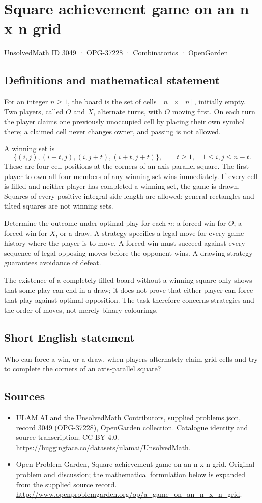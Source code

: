 \documentclass[11pt,a4paper]{article}
\begin{document}
\section*{Square achievement game on an n x n grid}\label{3049}
{\small UnsolvedMath ID 3049 · OPG-37228 · Combinatorics · OpenGarden}
\subsection{Definitions and mathematical statement}
For an integer $n\ge1$, the board is the set of cells
$[n]\times[n]$, initially empty. Two players, called $O$ and $X$, alternate
turns, with $O$ moving first. On each turn the player claims one previously
unoccupied cell by placing their own symbol there; a claimed cell never
changes owner, and passing is not allowed.

A winning set is
\[
 \{(i,j),(i+t,j),(i,j+t),(i+t,j+t)\},
 \qquad t\ge1,\quad 1\le i,j\le n-t.
\]
These are four cell positions at the corners of an axis-parallel square.
The first player to own all four members of any winning set wins immediately.
If every cell is filled and neither player has completed a winning set,
the game is drawn. Squares of every positive integral side length are
allowed; general rectangles and tilted squares are not winning sets.

Determine the outcome under optimal play for each $n$: a forced win for
$O$, a forced win for $X$, or a draw. A strategy specifies a legal move
for every game history where the player is to move. A forced win must
succeed against every sequence of legal opposing moves before the opponent
wins. A drawing strategy guarantees avoidance of defeat.

The existence of a completely filled board without a winning square only
shows that some play can end in a draw; it does not prove that either
player can force that play against optimal opposition. The task therefore
concerns strategies and the order of moves, not merely binary colourings.
\subsection{Short English statement}
Who can force a win, or a draw, when players alternately claim grid cells and try to complete the corners of an axis-parallel square?
\subsection{Sources}
\begin{itemize}
\item[S1] ULAM.AI and the UnsolvedMath Contributors, supplied problems.json, record 3049 (OPG-37228), OpenGarden collection. Catalogue identity and source transcription; CC BY 4.0.
\url{https://huggingface.co/datasets/ulamai/UnsolvedMath}.
\item[S2] Open Problem Garden, Square achievement game on an n x n grid. Original problem and discussion; the mathematical formulation below is expanded from the supplied source record.
\url{http://www.openproblemgarden.org/op/a_game_on_an_n_x_n_grid}.
\end{itemize}
\end{document}
